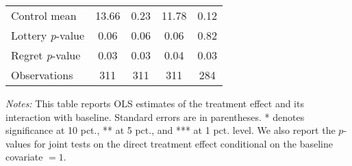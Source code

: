 \begin{table}[htbp]
{\begin{threeparttable}
\begin{tabular}{l*{4}{c}}
Control mean    &    13.66         &     0.23         &    11.78         &     0.12         \\
Lottery \emph{p}-value&     0.06         &     0.06         &     0.06         &     0.82         \\
Regret \emph{p}-value&     0.03         &     0.03         &     0.04         &     0.03         \\
Observations    &      311         &      311         &      311         &      284         \\
\bottomrule \end{tabular} \begin{tablenotes}[flushleft] \footnotesize \item \emph{Notes:} This table reports OLS estimates of the treatment effect and its interaction with baseline. Standard errors are in parentheses. * denotes significance at 10 pct., ** at 5 pct., and *** at 1 pct. level. We also report the \(p\)-values for joint tests on the direct treatment effect conditional on the baseline covariate $= 1$. \end{tablenotes} \end{threeparttable} } \end{table}

